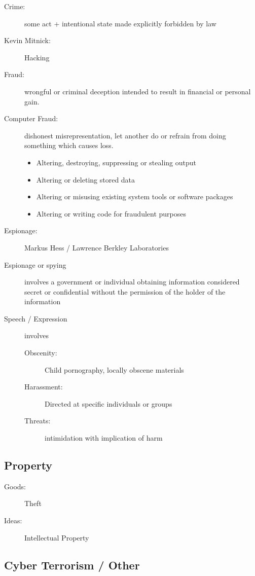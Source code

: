 \documentclass[a4paper]{article}
\begin{document}
\begin{description}
\item[Crime:] some act + intentional state made explicitly forbidden by law
\item[Kevin Mitnick: ] Hacking
\item[Fraud:] wrongful or criminal deception intended to result in financial or personal gain.
\item[Computer Fraud:] dishonest misrepresentation, let another do or refrain from doing something which causes loss.
\begin{itemize}
\item Altering, destroying, suppressing or stealing output
\item Altering or deleting stored data
\item Altering or misusing existing system tools or software packages
\item Altering or writing code for fraudulent purposes
\end{itemize}
\item[Espionage:] Markus Hess / Lawrence Berkley Laboratories
\item[Espionage or spying] involves a government or individual obtaining information considered secret or confidential without the permission of the holder of the information
\item[Speech / Expression] involves
\begin{description}
\item[Obscenity:] Child pornography, locally obscene materials
\item[Harassment:] Directed at specific individuals or groups
\item[Threats:] intimidation with implication of harm
\end{description}
\end{description}

\subsection*{Property}

\begin{description}
\item[Goods:] Theft
\item[Ideas:] Intellectual Property
\end{description}

\subsection*{Cyber Terrorism / Other}
\end{document}
